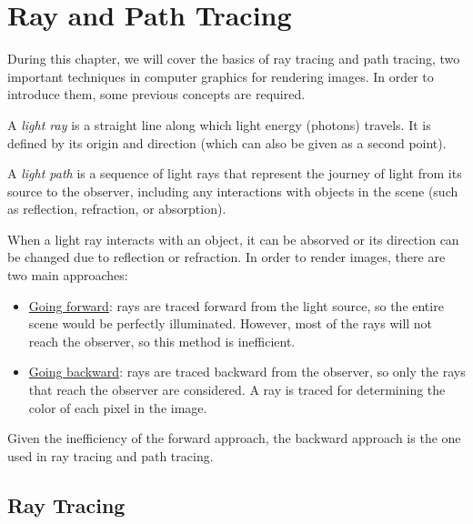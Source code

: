 \chapter{Ray and Path Tracing}

During this chapter, we will cover the basics of ray tracing and path tracing, two important techniques in computer graphics for rendering images. In order to introduce them, some previous concepts are required.

\begin{definicion}
    A \emph{light ray} is a straight line along which light energy (photons) travels. It is defined by its origin and direction (which can also be given as a second point).
\end{definicion}

\begin{definicion}
    A \emph{light path} is a sequence of light rays that represent the journey of light from its source to the observer, including any interactions with objects in the scene (such as reflection, refraction, or absorption).
\end{definicion}

When a light ray interacts with an object, it can be absorved or its direction can be changed due to reflection or refraction. In order to render images, there are two main approaches:
\begin{itemize}
    \item \ul{Going forward}: rays are traced forward from the light source, so the entire scene would be perfectly illuminated. However, most of the rays will not reach the observer, so this method is inefficient.
    \item \ul{Going backward}: rays are traced backward from the observer, so only the rays that reach the observer are considered. A ray is traced for determining the color of each pixel in the image.
\end{itemize}

Given the inefficiency of the forward approach, the backward approach is the one used in ray tracing and path tracing.


\section{Ray Tracing}

